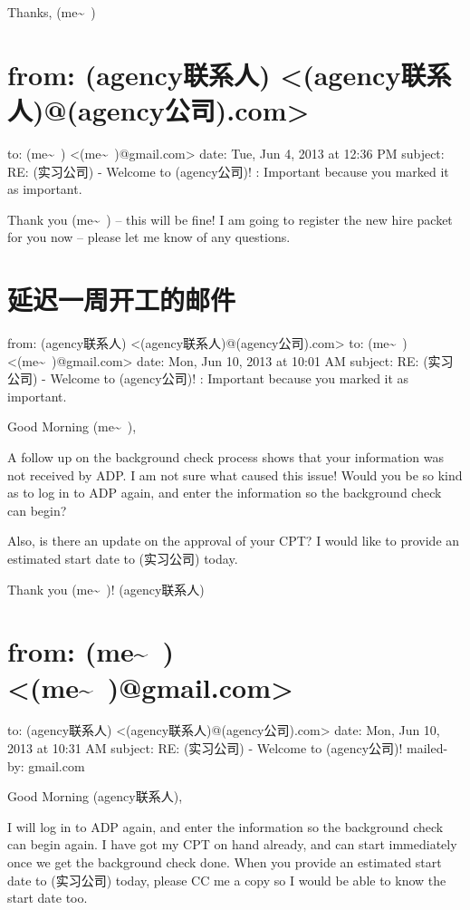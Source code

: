 \documentclass[12pt]{book}
\begin{document}
Thanks,
(me\textasciitilde{}~)


\section{from:         (agency联系人) <(agency联系人)@(agency公司).com>}
\label{sec-39-10}
to:         (me\textasciitilde{}~) <(me\textasciitilde{}~)@gmail.com>
date:         Tue, Jun 4, 2013 at 12:36 PM
subject:         RE: (实习公司) - Welcome to (agency公司)!
:         Important because you marked it as important.

Thank you (me\textasciitilde{}~) -- this will be fine! I am going to register the new hire packet for you now -- please let me know of any questions.


\section{延迟一周开工的邮件}
\label{sec-39-11}
from:         (agency联系人) <(agency联系人)@(agency公司).com>
to:         (me\textasciitilde{}~) <(me\textasciitilde{}~)@gmail.com>
date:         Mon, Jun 10, 2013 at 10:01 AM
subject:         RE: (实习公司) - Welcome to (agency公司)!
:         Important because you marked it as important.

Good Morning (me\textasciitilde{}~),

A follow up on the background check process shows that your information was not received by ADP. I am not sure what caused this issue! Would you be so kind as to log in to ADP again, and enter the information so the background check can begin?

Also, is there an update on the approval of your CPT? I would like to provide an estimated start date to (实习公司) today.

Thank you (me\textasciitilde{}~)!
(agency联系人)


\section{from:         (me\textasciitilde{}~) <(me\textasciitilde{}~)@gmail.com>}
\label{sec-39-12}
to:         (agency联系人) <(agency联系人)@(agency公司).com>
date:         Mon, Jun 10, 2013 at 10:31 AM
subject:         RE: (实习公司) - Welcome to (agency公司)!
mailed-by:         gmail.com

Good Morning (agency联系人),

I will log in to ADP again, and enter the information so the background check can begin again.
I have got my CPT on hand already, and can start immediately once we get the background check done.
When you provide an estimated start date to (实习公司) today, please CC me a copy so I would be able to know the start date too.
\end{document}
